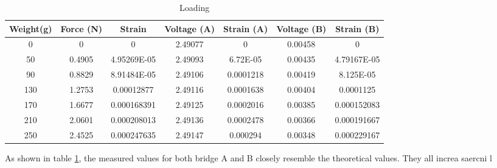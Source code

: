 \documentclass{article}
\begin{document}
\begin{table}[H]
    \centering
    \caption{Loading}
    \begin{tabular}{|c|c|c|c|c|c|c|}
    \hline
    Weight(g) & Force (N) & Strain & Voltage (A) & Strain (A) & Voltage (B) & Strain (B) \\ \hline
    0         & 0         & 0                   & 2.49077            & 0                 & 0.00458           & 0                \\ \hline
    50        & 0.4905    & 4.95269E-05         & 2.49093            & 6.72E-05          & 0.00435           & 4.79167E-05      \\ \hline
    90        & 0.8829    & 8.91484E-05         & 2.49106            & 0.0001218         & 0.00419           & 8.125E-05        \\ \hline
    130       & 1.2753    & 0.00012877          & 2.49116            & 0.0001638         & 0.00404           & 0.0001125        \\ \hline
    170       & 1.6677    & 0.000168391         & 2.49125            & 0.0002016         & 0.00385           & 0.000152083      \\ \hline
    210       & 2.0601    & 0.000208013         & 2.49136            & 0.0002478         & 0.00366           & 0.000191667      \\ \hline
    250       & 2.4525    & 0.000247635         & 2.49147            & 0.000294          & 0.00348           & 0.000229167      \\ \hline
    \end{tabular}
    \label{tab:loading}
\end{table}
    
As shown in table \ref{tab:loading}, the measured values for both bridge A and B closely resemble the theoretical values.  They all increa
saercni l
\end{document}
